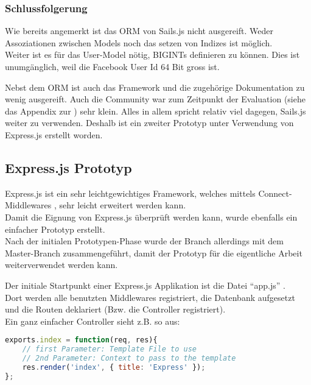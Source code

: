 \subsubsection*{Schlussfolgerung}

Wie bereits angemerkt ist das ORM von Sails.js nicht ausgereift. Weder Assoziationen zwischen Models \cite{SailsjsModelAssociations} noch das setzen von Indizes ist möglich.\\
Weiter ist es für das User-Model nötig, BIGINTs definieren zu können. Dies ist unumgänglich, weil die Facebook User Id 64 Bit gross ist.

Nebst dem ORM ist auch das Framework und die zugehörige Dokumentation zu wenig ausgereift. Auch die Community war zum Zeitpunkt der Evaluation (siehe das Appendix zur ) sehr klein.
Alles in allem spricht relativ viel dagegen, Sails.js weiter zu verwenden. Deshalb ist ein zweiter Prototyp unter Verwendung von Express.js erstellt worden.

\subsection*{Express.js Prototyp}

Express.js \cite{Expressjs} ist ein sehr leichtgewichtiges Framework, welches mittels Connect-Middlewares \cite{connect}, sehr leicht erweitert werden kann.\\[1mm]
Damit die Eignung von Express.js überprüft werden kann, wurde ebenfalls ein einfacher Prototyp \cite{ExpressjsPrototyp} erstellt.\\
Nach der initialen Prototypen-Phase wurde der Branch allerdings mit dem Master-Branch zusammengeführt, damit der Prototyp für die eigentliche Arbeit weiterverwendet werden kann.

Der initiale Startpunkt einer Express.js Applikation ist die Datei ``app.js'' \cite{ExpressjsPrototypAppjs}.\\
Dort werden alle benutzten Middlewares registriert, die Datenbank aufgesetzt und die Routen deklariert (Bzw. die Controller registriert).\\[0.5mm]

Ein ganz einfacher Controller sieht z.B. so aus:

\begin{lstlisting}[language=JavaScript, caption=Controller in Express.js, label=lst:controllerInExpressjs]
exports.index = function(req, res){
	// first Parameter: Template File to use
	// 2nd Parameter: Context to pass to the template
	res.render('index', { title: 'Express' });
};
\end{lstlisting}

